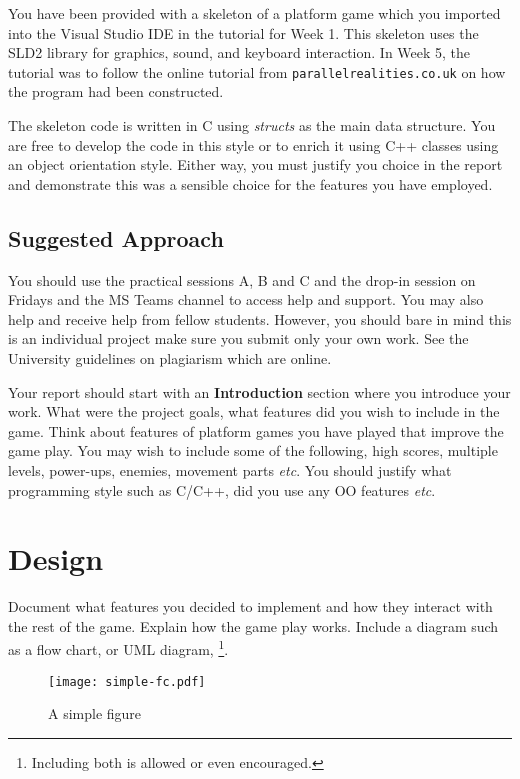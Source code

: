 You have been provided with a skeleton of a platform game which you
imported into the Visual Studio IDE in the tutorial for Week 1.
This skeleton uses the SLD2 library for graphics, sound, and keyboard interaction.
In Week 5, the tutorial was to follow the online tutorial from {\texttt{parallelrealities.co.uk}} on how the program had been constructed.

The skeleton code is written in C using {\em structs} as the main
data structure. You are free to develop the code in this style or to enrich it using C++ classes using an object orientation style.
Either way, you must justify you choice in the report and demonstrate this was
a sensible choice for the features you have employed.

\subsection{Suggested Approach}

You should use the practical sessions A, B and C and the drop-in
session on Fridays and the MS Teams channel to access help and support.
You may also help and receive help from fellow students.
However, you should bare in mind this is an individual project make sure you submit only your own work.
See the University guidelines on plagiarism which are online.  

Your report should start with an {\textbf{Introduction}} section where
you introduce your work. What were the project goals, what features
did you wish to include in the game. Think about features of platform games you have played that
improve the game play. You may wish to include some of the following,
high scores, multiple levels, power-ups, enemies, movement parts
{\em etc}. 
You should justify what
programming style such as C/C++, did you use any OO features {\em etc}.

\section{Design}
Document what features you decided to implement and how they interact with
the rest of the game. Explain how the game play works.  
Include a diagram such as a flow
chart,  or UML diagram, \footnote{Including
  both is allowed or even encouraged.}.

\begin{figure}[H]
\centering\texttt{[image: simple-fc.pdf]}
\caption{\label{fig:fc}A simple figure}
\end{figure}

